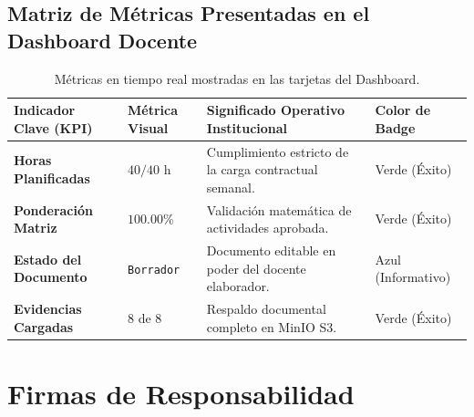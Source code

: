 \documentclass[12pt,a4paper]{article}
\begin{document}
\subsection{Matriz de Métricas Presentadas en el Dashboard Docente}
\begin{table}[H]
\centering
\small
\renewcommand{\arraystretch}{1.2}
\begin{tabularx}{\textwidth}{|>{\hsize=0.8\hsize\raggedright\arraybackslash\bfseries\footnotesize}X|>{\hsize=0.4\hsize\centering\arraybackslash\footnotesize}X|>{\hsize=2.2\hsize\raggedright\arraybackslash\footnotesize}X|>{\hsize=0.6\hsize\centering\arraybackslash\footnotesize}X|}
\hline
\rowcolor{tableheader}
\textbf{Indicador Clave (KPI)} & \textbf{Métrica Visual} & \textbf{Significado Operativo Institucional} & \textbf{Color de Badge} \\
\hline
Horas Planificadas & $40 / 40\text{ h}$ & Cumplimiento estricto de la carga contractual semanal. & Verde (Éxito) \\
\hline
Ponderación Matriz & $100.00\%$ & Validación matemática de actividades aprobada. & Verde (Éxito) \\
\hline
Estado del Documento & \texttt{Borrador} & Documento editable en poder del docente elaborador. & Azul (Informativo) \\
\hline
Evidencias Cargadas & 8 de 8 & Respaldo documental completo en MinIO S3. & Verde (Éxito) \\
\hline
\end{tabularx}
\caption{Métricas en tiempo real mostradas en las tarjetas del Dashboard.}
\end{table}

\section{Firmas de Responsabilidad}
\end{document}
